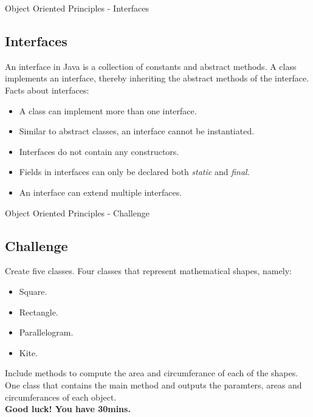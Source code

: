 \documentclass[11pt]{beamer}
\begin{document}
	\begin{frame}{Object Oriented Principles - Interfaces}
		\subsection{Interfaces}
		An interface in Java is a collection of constants and abstract methods. A class implements an interface, thereby inheriting the abstract methods of the interface.\\
		
		Facts about interfaces:
		\begin{itemize}
			\item{A class can implement more than one interface.}
			\item{Similar to abstract classes, an interface cannot be instantiated.}
			\item{Interfaces do not contain any constructors.}
			\item{Fields in interfaces can only be declared both \textit{static} and \textit{final}.}
			\item{An interface can extend multiple interfaces.}
		\end{itemize}
	\end{frame}

	\begin{frame}{Object Oriented Principles - Challenge}
		\subsection{Challenge}
		Create five classes. Four classes that represent mathematical shapes, namely:
		\begin{itemize}
			\item{Square.}
			\item{Rectangle.}
			\item{Parallelogram.}
			\item{Kite.}
		\end{itemize}
		
		Include methods to compute the area and circumferance of each of the shapes.\\
		 
		One class that contains the main method and outputs the paramters, areas and circumferances of each object.\\
		
		\textbf{Good luck! You have 30mins.}
	\end{frame}
	
\end{document}
